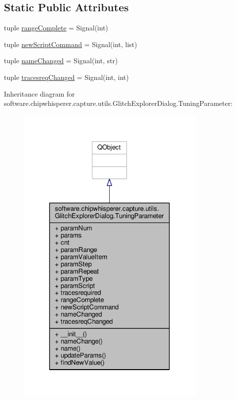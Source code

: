 \subsection*{Static Public Attributes}
\begin{DoxyCompactItemize}
\item 
tuple \hyperlink{classsoftware_1_1chipwhisperer_1_1capture_1_1utils_1_1GlitchExplorerDialog_1_1TuningParameter_a3c50db002aaf17c72ae76c40cc2ce59b}{range\+Complete} = Signal(int)
\item 
tuple \hyperlink{classsoftware_1_1chipwhisperer_1_1capture_1_1utils_1_1GlitchExplorerDialog_1_1TuningParameter_a3d5581b5f9d85c9e2de9c8484ccbc37f}{new\+Script\+Command} = Signal(int, list)
\item 
tuple \hyperlink{classsoftware_1_1chipwhisperer_1_1capture_1_1utils_1_1GlitchExplorerDialog_1_1TuningParameter_ae5d3a662d2326b11ed78d3b5ab2eda7b}{name\+Changed} = Signal(int, str)
\item 
tuple \hyperlink{classsoftware_1_1chipwhisperer_1_1capture_1_1utils_1_1GlitchExplorerDialog_1_1TuningParameter_ae76588f37a85ddc88ad7643712ea225c}{tracesreq\+Changed} = Signal(int, int)
\end{DoxyCompactItemize}


Inheritance diagram for software.\+chipwhisperer.\+capture.\+utils.\+Glitch\+Explorer\+Dialog.\+Tuning\+Parameter\+:\nopagebreak
\begin{figure}[H]
\begin{center}
\leavevmode
\includegraphics[width=263pt]{d2/dc1/classsoftware_1_1chipwhisperer_1_1capture_1_1utils_1_1GlitchExplorerDialog_1_1TuningParameter__inherit__graph}
\end{center}
\end{figure}


